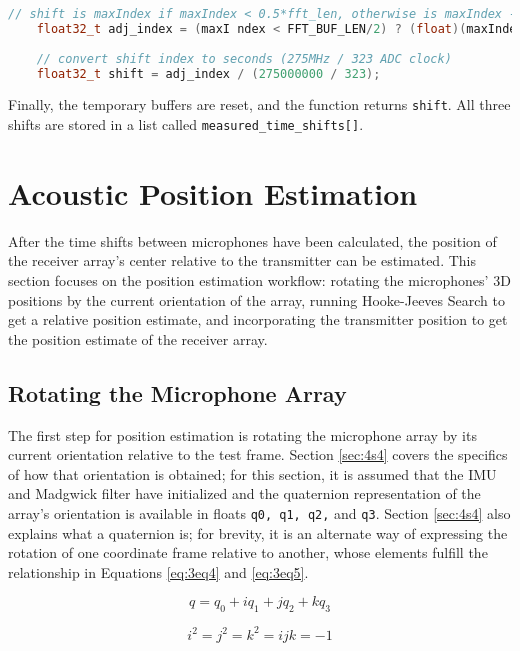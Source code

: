 \documentclass[12pt,a4paper]{report}
\begin{document}
\begin{lstlisting}[language=C++]
	// shift is maxIndex if maxIndex < 0.5*fft_len, otherwise is maxIndex - fft_len
	float32_t adj_index = (maxI ndex < FFT_BUF_LEN/2) ? (float)(maxIndex) : (float)(-FFT_BUF_LEN + maxIndex);
	
	// convert shift index to seconds (275MHz / 323 ADC clock)
	float32_t shift = adj_index / (275000000 / 323);
\end{lstlisting}

Finally, the temporary buffers are reset, and the function returns \verb|shift|. All three shifts are stored in a list called \verb|measured_time_shifts[]|.

\pagebreak

\section{Acoustic Position Estimation} \label{sec:3s9}
After the time shifts between microphones have been calculated, the position of the receiver array’s center relative to the transmitter can be estimated. This section focuses on the position estimation workflow: rotating the microphones’ 3D positions by the current orientation of the array, running Hooke-Jeeves Search to get a relative position estimate, and incorporating the transmitter position to get the position estimate of the receiver array.

\subsection{Rotating the Microphone Array} \label{ssec:3s9s1}
The first step for position estimation is rotating the microphone array by its current orientation relative to the test frame. Section \ref{sec:4s4} covers the specifics of how that orientation is obtained; for this section, it is assumed that the IMU and Madgwick filter have initialized and the quaternion representation of the array’s orientation is available in floats \verb|q0, q1, q2,| and \verb|q3|. Section \ref{sec:4s4} also explains what a quaternion is; for brevity, it is an alternate way of expressing the rotation of one coordinate frame relative to another, whose elements fulfill the relationship in Equations \ref{eq:3eq4} and \ref{eq:3eq5}.

\begin{equation} \label{eq:3eq4}
	q = q_0 + iq_1 + jq_2 + kq_3
\end{equation}

\begin{equation} \label{eq:3eq5}
	i^2 = j^2 = k^2 = ijk = -1
\end{equation}
\end{document}
